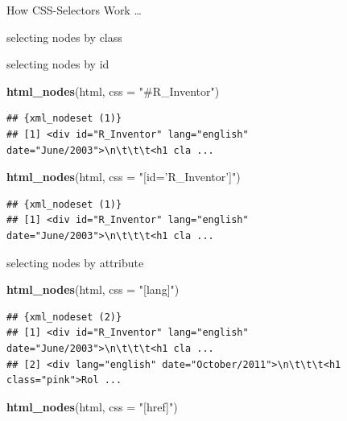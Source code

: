 \documentclass[ignorenonframetext,]{beamer}
\newenvironment{Shaded}{\begin{snugshade}}{\end{snugshade}}
\newcommand{\KeywordTok}[1]{\textcolor[rgb]{0.13,0.29,0.53}{\textbf{{#1}}}}
\newcommand{\DataTypeTok}[1]{\textcolor[rgb]{0.13,0.29,0.53}{{#1}}}
\newcommand{\StringTok}[1]{\textcolor[rgb]{0.31,0.60,0.02}{{#1}}}
\newcommand{\NormalTok}[1]{{#1}}
\begin{document}
\begin{frame}[fragile]{How CSS-Selectors Work \ldots{}}
\begin{block}{selecting nodes by class}
\end{block}

\begin{block}{selecting nodes by id}

\begin{Shaded}
\begin{Highlighting}[]
\KeywordTok{html_nodes}\NormalTok{(html, }\DataTypeTok{css =} \StringTok{"#R_Inventor"}\NormalTok{)}
\end{Highlighting}
\end{Shaded}

\begin{verbatim}
## {xml_nodeset (1)}
## [1] <div id="R_Inventor" lang="english" date="June/2003">\n\t\t\t<h1 cla ...
\end{verbatim}

\begin{Shaded}
\begin{Highlighting}[]
\KeywordTok{html_nodes}\NormalTok{(html, }\DataTypeTok{css =} \StringTok{"[id='R_Inventor']"}\NormalTok{)}
\end{Highlighting}
\end{Shaded}

\begin{verbatim}
## {xml_nodeset (1)}
## [1] <div id="R_Inventor" lang="english" date="June/2003">\n\t\t\t<h1 cla ...
\end{verbatim}

\end{block}

\begin{block}{selecting nodes by attribute}

\begin{Shaded}
\begin{Highlighting}[]
\KeywordTok{html_nodes}\NormalTok{(html, }\DataTypeTok{css =} \StringTok{"[lang]"}\NormalTok{)}
\end{Highlighting}
\end{Shaded}

\begin{verbatim}
## {xml_nodeset (2)}
## [1] <div id="R_Inventor" lang="english" date="June/2003">\n\t\t\t<h1 cla ...
## [2] <div lang="english" date="October/2011">\n\t\t\t<h1 class="pink">Rol ...
\end{verbatim}

\begin{Shaded}
\begin{Highlighting}[]
\KeywordTok{html_nodes}\NormalTok{(html, }\DataTypeTok{css =} \StringTok{"[href]"}\NormalTok{)}
\end{Highlighting}
\end{Shaded}


\end{block}
\end{frame}
\end{document}
